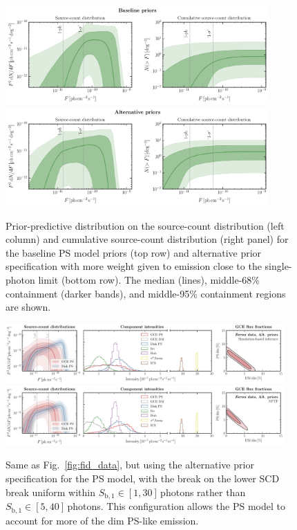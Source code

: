\documentclass[prd,aps,10pt,nofootinbib,twocolumn,superscriptaddress,preprintnumbers,balancelastpage,longbibliography]{revtex4-1}
\begin{document}
%
\begin{figure}
\centering
\includegraphics[width=0.9\textwidth]{plots/pp_check_baseline.pdf}
\includegraphics[width=0.9\textwidth]{plots/pp_check_alt.pdf}
\caption{Prior-predictive distribution on the source-count distribution (left column) and cumulative source-count distribution (right panel) for the baseline PS model priors (top row) and alternative prior specification with more weight given to emission close to the single-photon limit (bottom row). The median (lines), middle-68\% containment (darker bands), and middle-95\% containment regions are shown.}
\label{fig:pp_check}
\end{figure}
%

%
\begin{figure}
\centering
\includegraphics[width=0.95\textwidth]{plots/data_fid_sbi_new_ps_priors.pdf}
\includegraphics[width=0.95\textwidth]{plots/data_fid_nptf_new_ps_priors.pdf}
\caption{Same as Fig.~\ref{fig:fid_data}, but using the alternative prior specification for the PS model, with the break on the lower SCD break uniform within $S_{\mathrm{b}, 1}  \in  [1, 30]$\,photons rather than $S_{\mathrm{b}, 1}  \in  [5, 40]$\,photons. This configuration allows the PS model to account for more of the dim PS-like emission.}
\label{fig:fid_data_alt_priors}
\end{figure}
%
\end{document}
